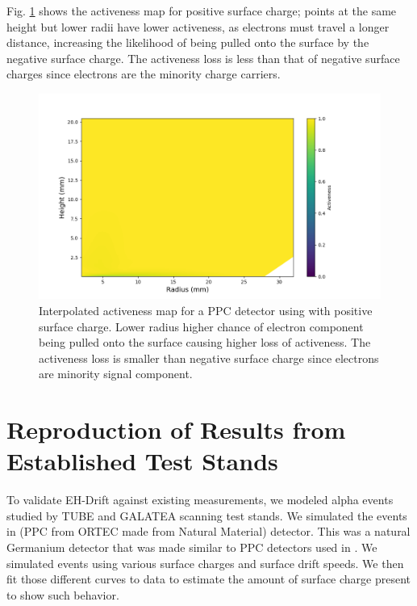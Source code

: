 Fig. \ref{ch5_fig_interpolated_activeness_map_pos} shows the activeness map for positive surface charge; points at the same height but lower radii have lower activeness, as electrons must travel a longer distance, increasing the likelihood of being pulled onto the surface by the negative surface charge. The activeness loss is less than that of negative surface charges since electrons are the minority charge carriers.

\begin{figure}%
\includegraphics[trim={1.5cm 0cm 3.3cm 1cm},clip,width=0.9\linewidth]{ch5/figs/activeness_map_cubic_sc=0.3_ponama_1_5000.png}
\caption{Interpolated activeness map for a PPC detector using \ehd with positive surface charge. Lower radius higher chance of electron component being pulled onto the surface causing higher loss of activeness. The activeness loss is smaller than negative surface charge since electrons are minority signal component.}
\label{ch5_fig_interpolated_activeness_map_pos}
\end{figure}


\section{\label{res:1} Reproduction of Results from Established Test Stands}

To validate EH-Drift against existing measurements, we modeled alpha events studied by TUBE and  GALATEA  scanning test stands. We simulated the events in {\ponama} (PPC from ORTEC made from Natural Material) detector. This was a natural Germanium detector that was made similar to PPC detectors used in {\MJD}. We simulated events using various surface charges and surface drift speeds.  We then fit those different curves to data to estimate the amount of surface charge present to show such behavior.

